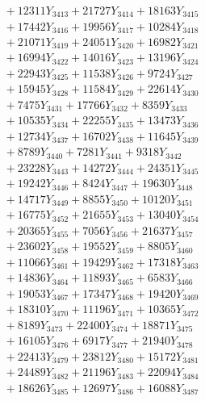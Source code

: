\documentclass[a4paper,10pt]{article}
\begin{document}
{\begin{align}
&\;  + 12311 Y_{3413} + 21727 Y_{3414} + 18163 Y_{3415} \\[0.3ex]
&\;  + 17442 Y_{3416} + 19956 Y_{3417} + 10284 Y_{3418} \\[0.5ex]\allowbreak
&\;  + 21071 Y_{3419} + 24051 Y_{3420} + 16982 Y_{3421} \\[0.3ex]
&\;  + 16994 Y_{3422} + 14016 Y_{3423} + 13196 Y_{3424} \\[0.3ex]
&\;  + 22943 Y_{3425} + 11538 Y_{3426} + 9724 Y_{3427} \\[0.3ex]
&\;  + 15945 Y_{3428} + 11584 Y_{3429} + 22614 Y_{3430} \\[0.3ex]
&\;  + 7475 Y_{3431} + 17766 Y_{3432} + 8359 Y_{3433} \\[0.3ex]
&\;  + 10535 Y_{3434} + 22255 Y_{3435} + 13473 Y_{3436} \\[0.3ex]
&\;  + 12734 Y_{3437} + 16702 Y_{3438} + 11645 Y_{3439} \\[0.3ex]
&\;  + 8789 Y_{3440} + 7281 Y_{3441} + 9318 Y_{3442} \\[0.3ex]
&\;  + 23228 Y_{3443} + 14272 Y_{3444} + 24351 Y_{3445} \\[0.3ex]
&\;  + 19242 Y_{3446} + 8424 Y_{3447} + 19630 Y_{3448} \\[0.5ex]\allowbreak
&\;  + 14717 Y_{3449} + 8855 Y_{3450} + 10120 Y_{3451} \\[0.3ex]
&\;  + 16775 Y_{3452} + 21655 Y_{3453} + 13040 Y_{3454} \\[0.3ex]
&\;  + 20365 Y_{3455} + 7056 Y_{3456} + 21637 Y_{3457} \\[0.3ex]
&\;  + 23602 Y_{3458} + 19552 Y_{3459} + 8805 Y_{3460} \\[0.3ex]
&\;  + 11066 Y_{3461} + 19429 Y_{3462} + 17318 Y_{3463} \\[0.3ex]
&\;  + 14836 Y_{3464} + 11893 Y_{3465} + 6583 Y_{3466} \\[0.3ex]
&\;  + 19053 Y_{3467} + 17347 Y_{3468} + 19420 Y_{3469} \\[0.3ex]
&\;  + 18310 Y_{3470} + 11196 Y_{3471} + 10365 Y_{3472} \\[0.3ex]
&\;  + 8189 Y_{3473} + 22400 Y_{3474} + 18871 Y_{3475} \\[0.3ex]
&\;  + 16105 Y_{3476} + 6917 Y_{3477} + 21940 Y_{3478} \\[0.5ex]\allowbreak
&\;  + 22413 Y_{3479} + 23812 Y_{3480} + 15172 Y_{3481} \\[0.3ex]
&\;  + 24489 Y_{3482} + 21196 Y_{3483} + 22094 Y_{3484} \\[0.3ex]
&\;  + 18626 Y_{3485} + 12697 Y_{3486} + 16088 Y_{3487} \\[0.3ex]

\end{align}}
\end{document}
